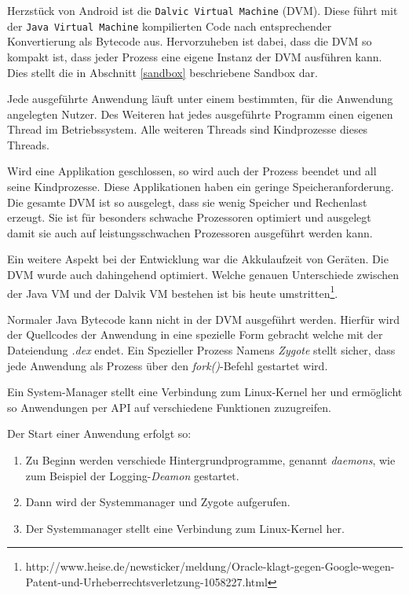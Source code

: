 Herzstück von Android ist die \verb+Dalvic Virtual Machine+ (DVM). Diese führt mit der \verb+Java Virtual Machine+ kompilierten Code nach entsprechender Konvertierung als Bytecode aus. Hervorzuheben ist dabei, dass die DVM so kompakt ist, dass jeder Prozess eine eigene Instanz der DVM ausführen kann. Dies stellt die in Abschnitt \ref{sandbox} beschriebene Sandbox dar.

Jede ausgeführte Anwendung läuft unter einem bestimmten, für die Anwendung angelegten Nutzer. Des Weiteren hat jedes ausgeführte Programm einen eigenen Thread im Betriebssystem. Alle weiteren Threads sind Kindprozesse dieses Threads.

Wird eine Applikation geschlossen, so wird auch der Prozess beendet und all seine Kindprozesse. Diese Applikationen haben ein geringe Speicheranforderung. Die gesamte DVM ist so ausgelegt, dass sie wenig Speicher und Rechenlast erzeugt. Sie ist für besonders schwache Prozessoren optimiert und ausgelegt damit sie auch auf leistungsschwachen Prozessoren ausgeführt werden kann.

Ein weitere Aspekt bei der Entwicklung war die Akkulaufzeit von Geräten. Die DVM wurde auch dahingehend optimiert. Welche genauen Unterschiede zwischen der Java VM und der Dalvik VM bestehen ist bis heute umstritten\footnote{http://www.heise.de/newsticker/meldung/Oracle-klagt-gegen-Google-wegen-Patent-und-Urheberrechtsverletzung-1058227.html}.

Normaler Java Bytecode kann nicht in der DVM ausgeführt werden. Hierfür wird der Quellcodes der Anwendung in eine spezielle Form gebracht welche mit der Dateiendung \textit{.dex} endet. Ein Spezieller Prozess Namens \textit{Zygote} stellt sicher, dass jede Anwendung als Prozess über den \textit{fork()}-Befehl gestartet wird.

Ein System-Manager stellt eine Verbindung zum Linux-Kernel her und ermöglicht so Anwendungen per API auf verschiedene Funktionen zuzugreifen.

Der Start einer Anwendung erfolgt so:

\begin{enumerate}
   \item Zu Beginn werden verschiede Hintergrundprogramme, genannt \textit{daemons}, wie zum Beispiel der Logging-\textit{Deamon} gestartet.
   \item Dann wird der Systemmanager und Zygote aufgerufen.
   \item Der Systemmanager stellt eine Verbindung zum Linux-Kernel her.
\end{enumerate}
 
